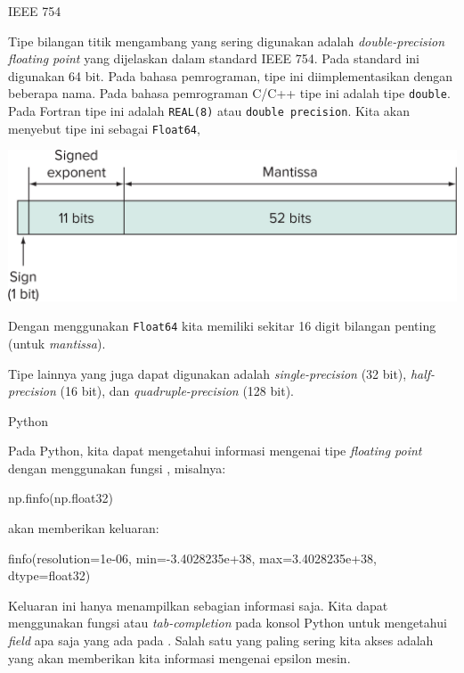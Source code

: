 \begin{frame}{IEEE 754}
\fontsize{9}{10}\selectfont

Tipe bilangan titik mengambang yang sering digunakan adalah \textit{double-precision
floating point} yang dijelaskan dalam standard IEEE 754. Pada standard ini digunakan
64 bit. Pada bahasa pemrograman, tipe ini diimplementasikan dengan beberapa nama.
Pada bahasa pemrograman C/C++ tipe ini adalah tipe \texttt{double}.
Pada Fortran tipe ini adalah \texttt{REAL(8)} atau \texttt{double precision}.
Kita akan menyebut tipe ini sebagai \texttt{Float64},

{\centering
\includegraphics[height=0.25\textheight]{../chapra_python/Chapra_Fig_4_6.png}
\par}

Dengan menggunakan \texttt{Float64} kita memiliki sekitar 16 digit
bilangan penting (untuk \textit{mantissa}).

Tipe lainnya yang juga dapat digunakan adalah \textit{single-precision} (32 bit),
\textit{half-precision} (16 bit), dan \textit{quadruple-precision} (128 bit).

\end{frame}



\begin{frame}[fragile]{Python}

Pada Python, kita dapat mengetahui informasi mengenai tipe \textit{floating point}
dengan menggunakan fungsi , misalnya:
\begin{pythoncode}
np.finfo(np.float32)
\end{pythoncode}
akan memberikan keluaran:
\begin{textcode}
finfo(resolution=1e-06, min=-3.4028235e+38, max=3.4028235e+38, dtype=float32)
\end{textcode}
Keluaran ini hanya menampilkan sebagian informasi saja. Kita dapat menggunakan
fungsi  atau \textit{tab-completion} pada konsol Python
untuk mengetahui \textit{field} apa saja yang ada pada .
Salah satu yang paling sering kita akses adalah 
yang akan memberikan kita informasi mengenai epsilon mesin.

\end{frame}


